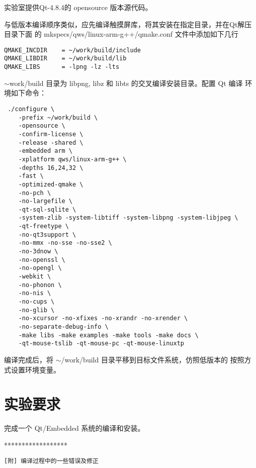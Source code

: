 实验室提供Qt-4.8.4的 opensource 版本源代码。

与低版本编译顺序类似，应先编译触摸屏库，将其安装在指定目录，并在Qt解压目录下面
的 mkspecs/qws/linux-arm-g++/qmake.conf 文件中添加如下几行
\begin{verbatim}
QMAKE_INCDIR    = ~/work/build/include
QMAKE_LIBDIR    = ~/work/build/lib
QMAKE_LIBS      = -lpng -lz -lts
\end{verbatim}

$\sim$work/build 目录为 libpng, libz 和 libts 的交叉编译安装目录。配置 Qt 编译
环境如下命令：

\begin{verbatim}
 ./configure \
    -prefix ~/work/build \
    -opensource \
    -confirm-license \
    -release -shared \
    -embedded arm \
    -xplatform qws/linux-arm-g++ \
    -depths 16,24,32 \
    -fast \
    -optimized-qmake \
    -no-pch \
    -no-largefile \
    -qt-sql-sqlite \
    -system-zlib -system-libtiff -system-libpng -system-libjpeg \
    -qt-freetype \
    -no-qt3support \
    -no-mmx -no-sse -no-sse2 \
    -no-3dnow \
    -no-openssl \
    -no-opengl \
    -webkit \
    -no-phonon \
    -no-nis \
    -no-cups \
    -no-glib \
    -no-xcursor -no-xfixes -no-xrandr -no-xrender \
    -no-separate-debug-info \
    -make libs -make examples -make tools -make docs \
    -qt-mouse-tslib -qt-mouse-pc -qt-mouse-linuxtp
\end{verbatim}

编译完成后，将 $\sim$/work/build 目录平移到目标文件系统，仿照低版本的
按照方式设置环境变量。


\section{实验要求}
	完成一个 Qt/Embedded 系统的编译和安装。
\newpage
\begin{center} ****************** \end{center}
\tt [附] 编译过程中的一些错误及修正

